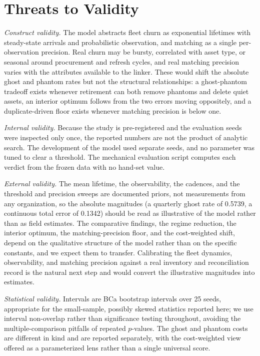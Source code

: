 \documentclass[journal]{IEEEtran}
\begin{document}
\section{Threats to Validity}
\emph{Construct validity.} The model abstracts fleet churn as exponential lifetimes with steady-state
arrivals and probabilistic observation, and matching as a single per-observation precision. Real
churn may be bursty, correlated with asset type, or seasonal around procurement and refresh cycles,
and real matching precision varies with the attributes available to the linker. These would shift the
absolute ghost and phantom rates but not the structural relationships: a ghost-phantom tradeoff exists
whenever retirement can both remove phantoms and delete quiet assets, an interior optimum follows from
the two errors moving oppositely, and a duplicate-driven floor exists whenever matching precision is
below one.

\emph{Internal validity.} Because the study is pre-registered and the evaluation seeds were inspected
only once, the reported numbers are not the product of analytic search. The development of the model
used separate seeds, and no parameter was tuned to clear a threshold. The mechanical evaluation
script computes each verdict from the frozen data with no hand-set value.

\emph{External validity.} The mean lifetime, the observability, the cadences, and the threshold and
precision sweeps are documented priors, not measurements from any organization, so the absolute
magnitudes (a quarterly ghost rate of 0.5739, a continuous total error of 0.1342) should be read as
illustrative of the model rather than as field estimates. The comparative findings, the regime
reduction, the interior optimum, the matching-precision floor, and the cost-weighted shift, depend on
the qualitative structure of the model rather than on the specific constants, and we expect them to
transfer. Calibrating the fleet dynamics, observability, and matching precision against a real
inventory and reconciliation record is the natural next step and would convert the illustrative
magnitudes into estimates.

\emph{Statistical validity.} Intervals are BCa bootstrap intervals over 25 seeds, appropriate for the
small-sample, possibly skewed statistics reported here; we use interval non-overlap rather than
significance testing throughout, avoiding the multiple-comparison pitfalls of repeated $p$-values.
The ghost and phantom costs are different in kind and are reported separately, with the cost-weighted
view offered as a parameterized lens rather than a single universal score.
\end{document}
